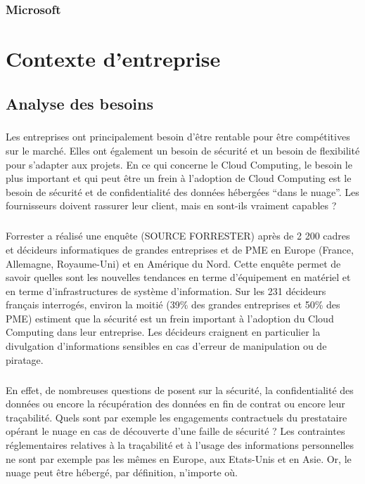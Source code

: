 \documentclass[a4paper,12pt]{report}
\begin{document}
\begin{onehalfspace}
	\subsection{Microsoft}


	
	\chapter{Contexte d’entreprise}
	
	\section{Analyse des besoins}

	\paragraph*{}
	Les entreprises ont principalement besoin d’être rentable pour être compétitives sur le marché. Elles ont également un besoin de sécurité et un besoin de flexibilité pour s’adapter aux projets. En ce qui concerne le Cloud Computing, le besoin le plus important et qui peut être un frein à l’adoption de Cloud Computing est le besoin de sécurité et de confidentialité des données hébergées “dans le nuage”. Les fournisseurs doivent rassurer leur client, mais en sont-ils vraiment capables ?

	\paragraph*{}
	Forrester a réalisé une enquête (SOURCE FORRESTER) après de 2 200 cadres et décideurs informatiques de grandes entreprises et de PME en Europe (France, Allemagne, Royaume-Uni) et en Amérique du Nord. Cette enquête permet de savoir quelles sont les nouvelles tendances en terme d’équipement en matériel et en terme d’infrastructures de système d’information. Sur les 231 décideurs français interrogés, environ la moitié (39\% des grandes entreprises et 50\% des PME) estiment que la sécurité est un frein important à l’adoption du Cloud Computing dans leur entreprise. Les décideurs craignent en particulier la divulgation d’informations sensibles en cas d’erreur de manipulation ou de piratage.

	\paragraph*{}
	En effet, de nombreuses questions de posent sur la sécurité, la confidentialité des données ou encore la récupération des données en fin de contrat ou encore leur traçabilité. Quels sont par exemple les engagements contractuels du prestataire opérant le nuage en cas de découverte d'une faille de sécurité ? Les contraintes réglementaires relatives à la traçabilité et à l'usage des informations personnelles ne sont par exemple pas les mêmes en Europe, aux Etats-Unis et en Asie. Or, le nuage peut être hébergé, par définition, n'importe où.


\end{onehalfspace}
\end{document}
